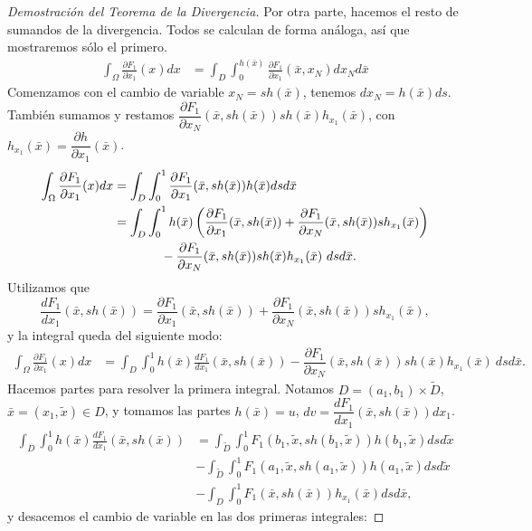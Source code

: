 \documentclass[12pt,spanish]{article}
\theoremstyle{definition}
\theoremstyle{remark}
\begin{document}
\begin{proof}[Demostración del Teorema de la Divergencia]
	Por otra parte, hacemos el resto de sumandos de la divergencia. Todos se calculan de forma análoga, así que mostraremos sólo el primero.
	\begin{align*}
	\int_\Omega\frac{\partial F_1}{\partial x_1}(x)dx&= \int_D\int_0^{h(\bar{x})}\frac{\partial F_1}{\partial x_1}(\bar{x},x_N)d x_N d\bar{x}
	\end{align*}
	Comenzamos con el cambio de variable $x_N=s h(\bar{x})$, tenemos $dx_N=h(\bar{x})ds$. También sumamos y restamos $\dfrac{\partial F_1}{\partial x_N}(\bar{x},sh(\bar{x}))sh(\bar{x})h_{x_1}(\bar{x})$, con $h_{x_1}(\bar{x})=\dfrac{\partial h}{\partial x_1}(\bar{x})$.
	\begin{align*}
	\int_\Omega\frac{\partial F_1}{\partial x_1}(x)dx&= \int_D\int_0^1\frac{\partial F_1}{\partial x_1}(\bar{x},s h(\bar{x})) h(\bar{x})ds d\bar{x} \\
	&=\int_D\int_0^1 h(\bar{x})\left(\frac{\partial F_1}{\partial x_1}(\bar{x},sh(\bar{x}))+\dfrac{\partial F_1}{\partial x_N}(\bar{x},sh(\bar{x}))sh_{x_1}(\bar{x})\right)\\
	&~\hspace{12mm}-\dfrac{\partial F_1}{\partial x_N}(\bar{x},sh(\bar{x}))sh(\bar{x})h_{x_1}(\bar{x}) \ dsd\bar{x}.
	\end{align*}
	Utilizamos que \[\frac{d F_1}{d x_1}(\bar{x},sh(\bar{x}))=\frac{\partial F_1}{\partial x_1}(\bar{x},sh(\bar{x}))+\dfrac{\partial F_1}{\partial x_N}(\bar{x},sh(\bar{x}))sh_{x_1}(\bar{x}),\]
	y la integral queda del siguiente modo:
	\begin{align}\label{eq:div-1}
	\int_\Omega\frac{\partial F_1}{\partial x_1}(x)dx
	&=\int_D\int_0^1 h(\bar{x})\frac{d F_1}{d x_1}(\bar{x},sh(\bar{x}))-\dfrac{\partial F_1}{\partial x_N}(\bar{x},sh(\bar{x}))sh(\bar{x})h_{x_1}(\bar{x}) \ dsd\bar{x}.
	\end{align}
	Hacemos partes para resolver la primera integral. Notamos $D=(a_1,b_1)\times \tilde{D}$, $\bar{x}=(x_1,\tilde{x})\in D$, y tomamos las partes $h(\bar{x})=u$, $dv=\dfrac{d F_1}{d x_1}(\bar{x},sh(\bar{x}))dx_1$.
	\begin{align*}
	\int_D\int_0^1 h(\bar{x})\frac{d F_1}{d x_1}(\bar{x},sh(\bar{x}))&=\int_{\tilde{D}}\int_0^1 F_1(b_1,\tilde{x}, sh(b_1,\tilde{x})) h(b_1,\tilde{x}) ds d\tilde{x}\\&-\int_{\tilde{D}}\int_0^1 F_1(a_1,\tilde{x}, sh(a_1,\tilde{x})) h(a_1,\tilde{x}) ds d\tilde{x}\\&-\int_D\int_0^1 F_1(\bar{x},sh(\bar{x}))h_{x_1}(\bar{x})dsd\bar{x},
	\end{align*}
	y desacemos el cambio de variable en las dos primeras integrales:
	

\end{proof}
\end{document}
